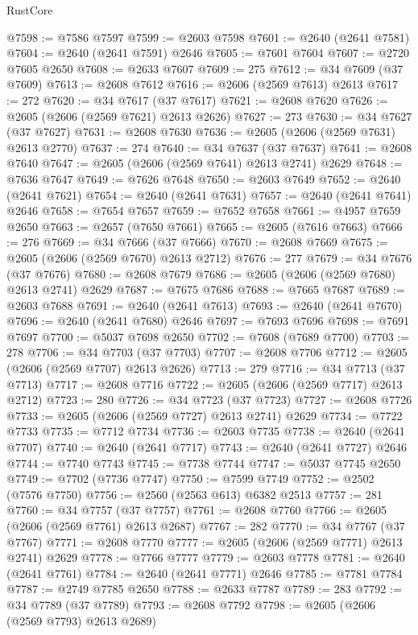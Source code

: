 \begin{lexlean}{RustCore}
\begin{coremodule}
@7598 := @7586 @7597
@7599 := @2603 @7598
@7601 := @2640 (@2641 @7581)
@7604 := @2640 (@2641 @7591) @2646
@7605 := @7601 @7604
@7607 := @2720 @7605 @2650
@7608 := @2633 @7607
@7609 := 275
@7612 := @34 @7609 (@37 @7609)
@7613 := @2608 @7612
@7616 := @2606 (@2569 @7613) @2613
@7617 := 272
@7620 := @34 @7617 (@37 @7617)
@7621 := @2608 @7620
@7626 := @2605 (@2606 (@2569 @7621) @2613 @2626)
@7627 := 273
@7630 := @34 @7627 (@37 @7627)
@7631 := @2608 @7630
@7636 := @2605 (@2606 (@2569 @7631) @2613 @2770)
@7637 := 274
@7640 := @34 @7637 (@37 @7637)
@7641 := @2608 @7640
@7647 := @2605 (@2606 (@2569 @7641) @2613 @2741) @2629
@7648 := @7636 @7647
@7649 := @7626 @7648
@7650 := @2603 @7649
@7652 := @2640 (@2641 @7621)
@7654 := @2640 (@2641 @7631)
@7657 := @2640 (@2641 @7641) @2646
@7658 := @7654 @7657
@7659 := @7652 @7658
@7661 := @4957 @7659 @2650
@7663 := @2657 (@7650 @7661)
@7665 := @2605 (@7616 @7663)
@7666 := 276
@7669 := @34 @7666 (@37 @7666)
@7670 := @2608 @7669
@7675 := @2605 (@2606 (@2569 @7670) @2613 @2712)
@7676 := 277
@7679 := @34 @7676 (@37 @7676)
@7680 := @2608 @7679
@7686 := @2605 (@2606 (@2569 @7680) @2613 @2741) @2629
@7687 := @7675 @7686
@7688 := @7665 @7687
@7689 := @2603 @7688
@7691 := @2640 (@2641 @7613)
@7693 := @2640 (@2641 @7670)
@7696 := @2640 (@2641 @7680) @2646
@7697 := @7693 @7696
@7698 := @7691 @7697
@7700 := @5037 @7698 @2650
@7702 := @7608 (@7689 @7700)
@7703 := 278
@7706 := @34 @7703 (@37 @7703)
@7707 := @2608 @7706
@7712 := @2605 (@2606 (@2569 @7707) @2613 @2626)
@7713 := 279
@7716 := @34 @7713 (@37 @7713)
@7717 := @2608 @7716
@7722 := @2605 (@2606 (@2569 @7717) @2613 @2712)
@7723 := 280
@7726 := @34 @7723 (@37 @7723)
@7727 := @2608 @7726
@7733 := @2605 (@2606 (@2569 @7727) @2613 @2741) @2629
@7734 := @7722 @7733
@7735 := @7712 @7734
@7736 := @2603 @7735
@7738 := @2640 (@2641 @7707)
@7740 := @2640 (@2641 @7717)
@7743 := @2640 (@2641 @7727) @2646
@7744 := @7740 @7743
@7745 := @7738 @7744
@7747 := @5037 @7745 @2650
@7749 := @7702 (@7736 @7747)
@7750 := @7599 @7749
@7752 := @2502 (@7576 @7750)
@7756 := @2560 (@2563 @613) @6382 @2513
@7757 := 281
@7760 := @34 @7757 (@37 @7757)
@7761 := @2608 @7760
@7766 := @2605 (@2606 (@2569 @7761) @2613 @2687)
@7767 := 282
@7770 := @34 @7767 (@37 @7767)
@7771 := @2608 @7770
@7777 := @2605 (@2606 (@2569 @7771) @2613 @2741) @2629
@7778 := @7766 @7777
@7779 := @2603 @7778
@7781 := @2640 (@2641 @7761)
@7784 := @2640 (@2641 @7771) @2646
@7785 := @7781 @7784
@7787 := @2749 @7785 @2650
@7788 := @2633 @7787
@7789 := 283
@7792 := @34 @7789 (@37 @7789)
@7793 := @2608 @7792
@7798 := @2605 (@2606 (@2569 @7793) @2613 @2689)

\end{coremodule}
\end{lexlean}

